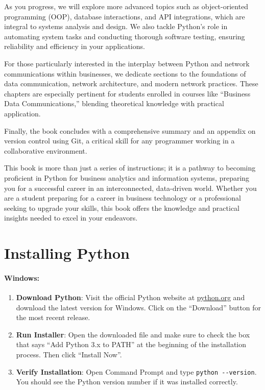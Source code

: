 \documentclass[
  letterpaper,
  DIV=11,
  numbers=noendperiod]{scrreprt}
\providecommand{\tightlist}{%
  \setlength{\itemsep}{0pt}\setlength{\parskip}{0pt}}\usepackage{longtable,booktabs,array}
\begin{document}
As you progress, we will explore more advanced topics such as
object-oriented programming (OOP), database interactions, and API
integrations, which are integral to systems analysis and design. We also
tackle Python's role in automating system tasks and conducting thorough
software testing, ensuring reliability and efficiency in your
applications.

For those particularly interested in the interplay between Python and
network communications within businesses, we dedicate sections to the
foundations of data communication, network architecture, and modern
network practices. These chapters are especially pertinent for students
enrolled in courses like ``Business Data Communications,'' blending
theoretical knowledge with practical application.

Finally, the book concludes with a comprehensive summary and an appendix
on version control using Git, a critical skill for any programmer
working in a collaborative environment.

This book is more than just a series of instructions; it is a pathway to
becoming proficient in Python for business analytics and information
systems, preparing you for a successful career in an interconnected,
data-driven world. Whether you are a student preparing for a career in
business technology or a professional seeking to upgrade your skills,
this book offers the knowledge and practical insights needed to excel in
your endeavors.


\chapter{Installing Python}\label{installing-python}

\subsubsection{Windows:}\label{windows}

\begin{enumerate}
\def\labelenumi{\arabic{enumi}.}
\tightlist
\item
  \textbf{Download Python}: Visit the official Python website at
  \href{https://www.python.org/downloads/}{python.org} and download the
  latest version for Windows. Click on the ``Download'' button for the
  most recent release.
\item
  \textbf{Run Installer}: Open the downloaded file and make sure to
  check the box that says ``Add Python 3.x to PATH'' at the beginning of
  the installation process. Then click ``Install Now''.
\item
  \textbf{Verify Installation}: Open Command Prompt and type
  \texttt{python\ -\/-version}. You should see the Python version number
  if it was installed correctly.
\end{enumerate}
\end{document}
